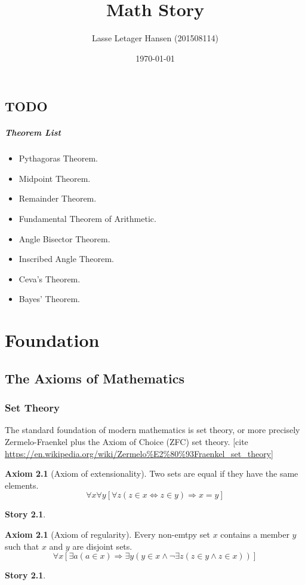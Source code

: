\documentclass[11pt]{report}
\author{Lasse Letager Hansen (201508114)}
\date{\today}
\title{Math Story}
\theoremstyle{plain} %
\theoremstyle{definition}
\newtheorem{axiom}[thm]{Axiom}%
\newtheorem{st}[thm]{Story}%
\theoremstyle{remark}
\begin{document}
\maketitle

\section{TODO}
\paragraph{Theorem List}
\begin{itemize}
\item Pythagoras Theorem.
\item Midpoint Theorem.
\item Remainder Theorem.
\item Fundamental Theorem of Arithmetic.
\item Angle Bisector Theorem.
\item Inscribed Angle Theorem.
\item Ceva's Theorem.
\item Bayes' Theorem.
\end{itemize}

\chapter{Foundation}
\section{The Axioms of Mathematics}
\subsection{Set Theory}
The standard foundation of modern mathematics is set theory, or more precisely Zermelo-Fraenkel plus the Axiom of Choice (ZFC) set theory. [cite \url{https://en.wikipedia.org/wiki/Zermelo%E2%80%93Fraenkel_set_theory}]
\begin{axiom}[Axiom of extensionality]
  Two sets are equal if they have the same elements.
  \[\forall x \forall y [ \forall z (z \in x \iff z \in y) \Rightarrow x = y ] \]
\end{axiom}
\begin{st}
\end{st}

\begin{axiom}[Axiom of regularity]
  Every non-emtpy set \(x\) contains a member \(y\) such that \(x\) and \(y\) are disjoint sets.
  \[\forall x [ \exists a ( a \in x ) \Rightarrow \exists y (y \in x \land \neg \exists z (z \in y \land z \in x)) ] \]
\end{axiom}
\begin{st}
  
\end{st}
\end{document}
